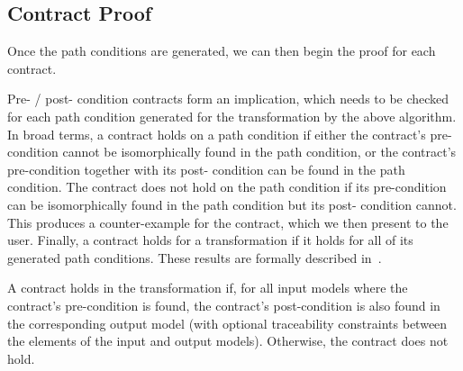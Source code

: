 \subsection{Contract Proof}

Once the path conditions are generated, we can then begin the proof for each contract.

Pre- / post- condition contracts form an implication, which
needs to be checked for each path condition generated for
the transformation by the above algorithm. In broad terms,
a contract holds on a path condition if either the contract’s
pre-condition cannot be isomorphically found in the path
condition, or the contract’s pre-condition together with its post-
condition can be found in the path condition. The contract
does not hold on the path condition if its pre-condition can
be isomorphically found in the path condition but its post-
condition cannot. This produces a counter-example for the contract, which we then present to the user. Finally, a contract holds for a transformation if it holds for all of its generated path conditions. These results
are formally described in~\cite{Lucio2014}.

A contract holds in the transformation if, for all input models where the contract's pre-condition is found, the contract's post-condition is also found in the corresponding output model (with optional traceability constraints between the elements of the input and output models). Otherwise, the contract does not hold.


